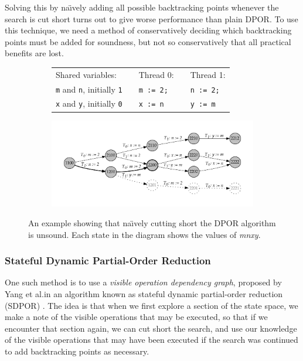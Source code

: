 \documentclass[12pt,a4paper,twoside,openany]{report}
\begin{document}
Solving this by na\"{\i}vely adding
all possible backtracking points
whenever the search is cut short turns out to
give worse performance than plain DPOR.
To use this technique,
we need a method of conservatively deciding which
backtracking points must be added for soundness, but not
so conservatively that all practical benefits are lost.

\begin{figure}
	\begin{subfigure}{\textwidth}
		\begin{tabular}{lp{1cm}lp{0cm}l}
		Shared variables: &&Thread 0: &&Thread 1: \\
		\qquad \texttt{m} and \texttt{n}, initially \texttt{1}
			&&\qquad\texttt{m := 2;}
			&& \qquad\texttt{n := 2;} \\
		\qquad \texttt{x} and \texttt{y}, initially \texttt{0}
			&&\qquad\texttt{x := n}
			&& \qquad\texttt{y := m}
		\end{tabular}
	\end{subfigure}
	\begin{subfigure}{\textwidth}
		\includegraphics[width=\textwidth]{sdpor}
	\end{subfigure}
	\caption[An example illustrating the need for the
		Stateful DPOR algorithm.]
		{An example showing that na\"{\i}vely
		cutting short the DPOR algorithm is
		unsound. Each state in the diagram shows
	the values of \textit{mnxy}.}
	\label{fig:sdpor-motivation}
\end{figure}

\subsubsection{Stateful Dynamic Partial-Order Reduction}

One such method is to use a \emph{visible operation dependency
graph}, proposed by Yang et al.\@ in an
algorithm known as stateful dynamic
partial-order reduction (SDPOR) \cite{yang08}.
The idea is that when we first explore
a section of the state space,
we make a note of the visible operations
that may be executed, so that if we encounter that section again,
we can cut short the search, and use our knowledge of the
visible operations that may have been
executed if the search was continued
to add backtracking points as necessary.
\end{document}
